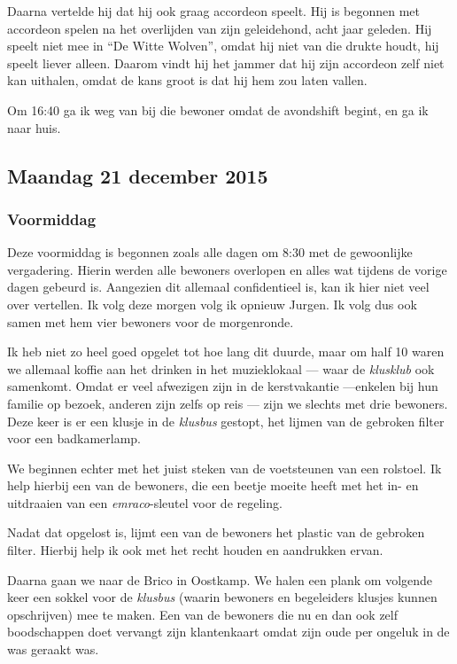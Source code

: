 \documentclass[a4paper,12pt]{article}
\begin{document}
Daarna vertelde hij dat hij ook graag accordeon speelt. Hij is begonnen met accordeon spelen na het overlijden van zijn geleidehond, acht jaar geleden. Hij speelt niet mee in ``De Witte Wolven'', omdat hij niet van die drukte houdt, hij speelt liever alleen. Daarom vindt hij het jammer dat hij zijn accordeon zelf niet kan uithalen, omdat de kans groot is dat hij hem zou laten vallen.

Om 16:40 ga ik weg van bij die bewoner omdat de avondshift begint, en ga ik naar huis.

\subsection{Maandag 21 december 2015}
\subsubsection{Voormiddag}
Deze voormiddag is begonnen zoals alle dagen om 8:30 met de gewoonlijke vergadering. Hierin werden alle bewoners overlopen en alles wat tijdens de vorige dagen gebeurd is. Aangezien dit allemaal confidentieel is, kan ik hier niet veel over vertellen. Ik volg deze morgen volg ik opnieuw Jurgen. Ik volg dus ook samen met hem vier bewoners voor de morgenronde.

Ik heb niet zo heel goed opgelet tot hoe lang dit duurde, maar om half 10 waren we allemaal koffie aan het drinken in het muzieklokaal --- waar de \emph{klusklub} ook samenkomt. Omdat er veel afwezigen zijn in de kerstvakantie ---enkelen bij hun familie op bezoek, anderen zijn zelfs op reis --- zijn we slechts met drie bewoners. Deze keer is er een klusje in de \emph{klusbus} gestopt, het lijmen van de gebroken filter voor een badkamerlamp.

We beginnen echter met het juist steken van de voetsteunen van een rolstoel. Ik help hierbij een van de bewoners, die een beetje moeite heeft met het in- en uitdraaien van een \emph{emraco}-sleutel voor de regeling.

Nadat dat opgelost is, lijmt een van de bewoners het plastic van de gebroken filter. Hierbij help ik ook met het recht houden en aandrukken ervan.

Daarna gaan we naar de Brico in Oostkamp. We halen een plank om volgende keer een sokkel voor de \emph{klusbus} (waarin bewoners en begeleiders klusjes kunnen opschrijven) mee te maken. Een van de bewoners die nu en dan ook zelf boodschappen doet vervangt zijn klantenkaart omdat zijn oude per ongeluk in de was geraakt was.
\end{document}
